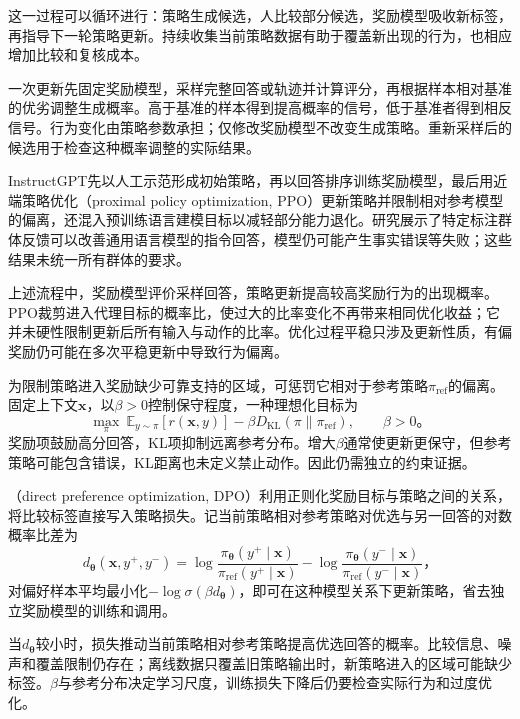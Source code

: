 这一过程可以循环进行：策略生成候选，人比较部分候选，奖励模型吸收新标签，再指导下一轮策略更新。持续收集当前策略数据有助于覆盖新出现的行为，也相应增加比较和复核成本。

一次更新先固定奖励模型，采样完整回答或轨迹并计算评分，再根据样本相对基准的优劣调整生成概率。高于基准的样本得到提高概率的信号，低于基准者得到相反信号。行为变化由策略参数承担；仅修改奖励模型不改变生成策略。重新采样后的候选用于检查这种概率调整的实际结果。

InstructGPT先以人工示范形成初始策略，再以回答排序训练奖励模型，最后用近端策略优化（proximal policy optimization, PPO）更新策略并限制相对参考模型的偏离，还混入预训练语言建模目标以减轻部分能力退化。研究展示了特定标注群体反馈可以改善通用语言模型的指令回答，模型仍可能产生事实错误等失败；这些结果未统一所有群体的要求。

上述流程中，奖励模型评价采样回答，策略更新提高较高奖励行为的出现概率。PPO裁剪进入代理目标的概率比，使过大的比率变化不再带来相同优化收益；它并未硬性限制更新后所有输入与动作的比率。优化过程平稳只涉及更新性质，有偏奖励仍可能在多次平稳更新中导致行为偏离。

为限制策略进入奖励缺少可靠支持的区域，可惩罚它相对于参考策略$\pi_{\mathrm{ref}}$的偏离。固定上下文$\bm{x}$，以$\beta>0$控制保守程度，一种理想化目标为
\begin{equation}
 \max_\pi\
 \mathbb E_{y\sim\pi}[r(\bm{x},y)]
 -\beta D_{\mathrm{KL}}(\pi\|\pi_{\mathrm{ref}}),
 \qquad \beta>0\text{。}
 \label{eq:alignment-kl-objective}
\end{equation}
奖励项鼓励高分回答，KL项抑制远离参考分布。增大$\beta$通常使更新更保守，但参考策略可能包含错误，KL距离也未定义禁止动作。因此仍需独立的约束证据。

（direct preference optimization, DPO）利用正则化奖励目标与策略之间的关系，将比较标签直接写入策略损失。记当前策略相对参考策略对优选与另一回答的对数概率比差为
\[
 d_{\bm{\theta}}(\bm{x},y^+,y^-)
 =\log\frac{\pi_{\bm{\theta}}(y^+\mid\bm{x})}
              {\pi_{\mathrm{ref}}(y^+\mid\bm{x})}
 -\log\frac{\pi_{\bm{\theta}}(y^-\mid\bm{x})}
              {\pi_{\mathrm{ref}}(y^-\mid\bm{x})}\text{，}
\]
对偏好样本平均最小化$-\log\sigma(\beta d_{\bm\theta})$，即可在这种模型关系下更新策略，省去独立奖励模型的训练和调用。

当$d_{\bm\theta}$较小时，损失推动当前策略相对参考策略提高优选回答的概率。比较信息、噪声和覆盖限制仍存在；离线数据只覆盖旧策略输出时，新策略进入的区域可能缺少标签。$\beta$与参考分布决定学习尺度，训练损失下降后仍要检查实际行为和过度优化。

